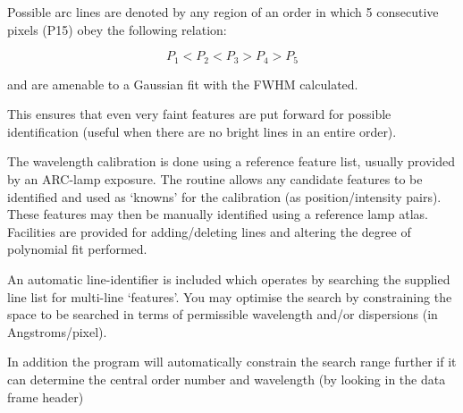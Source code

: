 Possible arc lines are denoted by any region of an order in which 5
consecutive pixels (P1\sunspec{--}{-}5) obey the following relation:

\begin{displaymath}
P_{1} < P_{2} < P_{3} > P_{4} > P_{5}
\end{displaymath}


and are amenable to a Gaussian fit with the FWHM calculated.

This ensures that even very faint features are put forward for possible
identification (useful when there are no bright lines in an entire
order).






The wavelength calibration is done using a reference feature list, usually
provided by an ARC-lamp exposure. The routine allows any candidate features
to be identified and used as `knowns' for the calibration (as
position/intensity pairs). These features may then be manually identified
using a reference lamp atlas. Facilities are provided for adding/deleting
lines and altering the degree of polynomial fit performed.

An automatic line-identifier is included which operates by searching the
supplied line list for multi-line `features'.
You may optimise the search by constraining the space to be searched in
terms of permissible wavelength and/or dispersions (in Angstroms/pixel).

In addition the program will automatically constrain the search range
further if it can determine the central order number and wavelength (by
looking in the data frame header)

